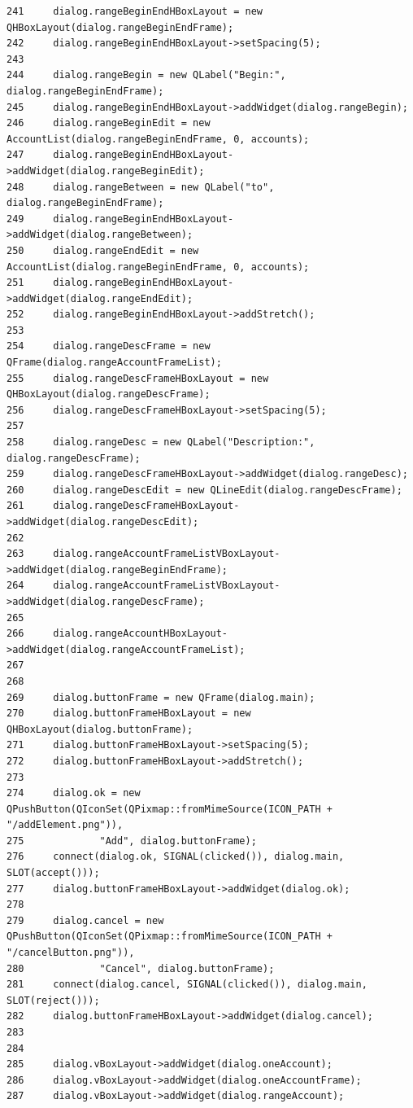 \begin{verbatim}
241     dialog.rangeBeginEndHBoxLayout = new QHBoxLayout(dialog.rangeBeginEndFrame);
242     dialog.rangeBeginEndHBoxLayout->setSpacing(5);
243     
244     dialog.rangeBegin = new QLabel("Begin:", dialog.rangeBeginEndFrame);
245     dialog.rangeBeginEndHBoxLayout->addWidget(dialog.rangeBegin);
246     dialog.rangeBeginEdit = new AccountList(dialog.rangeBeginEndFrame, 0, accounts);
247     dialog.rangeBeginEndHBoxLayout->addWidget(dialog.rangeBeginEdit);
248     dialog.rangeBetween = new QLabel("to", dialog.rangeBeginEndFrame);
249     dialog.rangeBeginEndHBoxLayout->addWidget(dialog.rangeBetween);
250     dialog.rangeEndEdit = new AccountList(dialog.rangeBeginEndFrame, 0, accounts);
251     dialog.rangeBeginEndHBoxLayout->addWidget(dialog.rangeEndEdit);
252     dialog.rangeBeginEndHBoxLayout->addStretch();
253     
254     dialog.rangeDescFrame = new QFrame(dialog.rangeAccountFrameList);
255     dialog.rangeDescFrameHBoxLayout = new QHBoxLayout(dialog.rangeDescFrame);
256     dialog.rangeDescFrameHBoxLayout->setSpacing(5);
257     
258     dialog.rangeDesc = new QLabel("Description:", dialog.rangeDescFrame);
259     dialog.rangeDescFrameHBoxLayout->addWidget(dialog.rangeDesc);
260     dialog.rangeDescEdit = new QLineEdit(dialog.rangeDescFrame);
261     dialog.rangeDescFrameHBoxLayout->addWidget(dialog.rangeDescEdit);
262     
263     dialog.rangeAccountFrameListVBoxLayout->addWidget(dialog.rangeBeginEndFrame);
264     dialog.rangeAccountFrameListVBoxLayout->addWidget(dialog.rangeDescFrame);
265     
266     dialog.rangeAccountHBoxLayout->addWidget(dialog.rangeAccountFrameList);
267     
268         
269     dialog.buttonFrame = new QFrame(dialog.main);
270     dialog.buttonFrameHBoxLayout = new QHBoxLayout(dialog.buttonFrame);
271     dialog.buttonFrameHBoxLayout->setSpacing(5);
272     dialog.buttonFrameHBoxLayout->addStretch();
273     
274     dialog.ok = new QPushButton(QIconSet(QPixmap::fromMimeSource(ICON_PATH + "/addElement.png")),
275             "Add", dialog.buttonFrame);
276     connect(dialog.ok, SIGNAL(clicked()), dialog.main, SLOT(accept()));
277     dialog.buttonFrameHBoxLayout->addWidget(dialog.ok);
278     
279     dialog.cancel = new QPushButton(QIconSet(QPixmap::fromMimeSource(ICON_PATH + "/cancelButton.png")),
280             "Cancel", dialog.buttonFrame);
281     connect(dialog.cancel, SIGNAL(clicked()), dialog.main, SLOT(reject()));
282     dialog.buttonFrameHBoxLayout->addWidget(dialog.cancel);
283     
284     
285     dialog.vBoxLayout->addWidget(dialog.oneAccount);
286     dialog.vBoxLayout->addWidget(dialog.oneAccountFrame);
287     dialog.vBoxLayout->addWidget(dialog.rangeAccount);

\end{verbatim}
